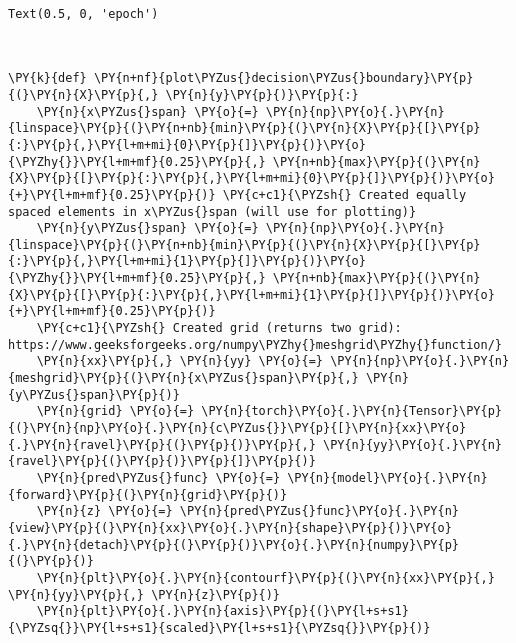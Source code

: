             \begin{tcolorbox}[breakable, size=fbox, boxrule=.5pt, pad at break*=1mm, opacityfill=0]
\begin{Verbatim}[commandchars=\\\{\}]
Text(0.5, 0, 'epoch')
\end{Verbatim}
\end{tcolorbox}
        
    \begin{center}
    \end{center}
    { \hspace*{\fill} \\}
    
    \begin{tcolorbox}[breakable, size=fbox, boxrule=1pt, pad at break*=1mm,colback=cellbackground, colframe=cellborder]
\begin{Verbatim}[commandchars=\\\{\}]
\PY{k}{def} \PY{n+nf}{plot\PYZus{}decision\PYZus{}boundary}\PY{p}{(}\PY{n}{X}\PY{p}{,} \PY{n}{y}\PY{p}{)}\PY{p}{:}
    \PY{n}{x\PYZus{}span} \PY{o}{=} \PY{n}{np}\PY{o}{.}\PY{n}{linspace}\PY{p}{(}\PY{n+nb}{min}\PY{p}{(}\PY{n}{X}\PY{p}{[}\PY{p}{:}\PY{p}{,}\PY{l+m+mi}{0}\PY{p}{]}\PY{p}{)}\PY{o}{\PYZhy{}}\PY{l+m+mf}{0.25}\PY{p}{,} \PY{n+nb}{max}\PY{p}{(}\PY{n}{X}\PY{p}{[}\PY{p}{:}\PY{p}{,}\PY{l+m+mi}{0}\PY{p}{]}\PY{p}{)}\PY{o}{+}\PY{l+m+mf}{0.25}\PY{p}{)} \PY{c+c1}{\PYZsh{} Created equally spaced elements in x\PYZus{}span (will use for plotting)}
    \PY{n}{y\PYZus{}span} \PY{o}{=} \PY{n}{np}\PY{o}{.}\PY{n}{linspace}\PY{p}{(}\PY{n+nb}{min}\PY{p}{(}\PY{n}{X}\PY{p}{[}\PY{p}{:}\PY{p}{,}\PY{l+m+mi}{1}\PY{p}{]}\PY{p}{)}\PY{o}{\PYZhy{}}\PY{l+m+mf}{0.25}\PY{p}{,} \PY{n+nb}{max}\PY{p}{(}\PY{n}{X}\PY{p}{[}\PY{p}{:}\PY{p}{,}\PY{l+m+mi}{1}\PY{p}{]}\PY{p}{)}\PY{o}{+}\PY{l+m+mf}{0.25}\PY{p}{)} 
    \PY{c+c1}{\PYZsh{} Created grid (returns two grid): https://www.geeksforgeeks.org/numpy\PYZhy{}meshgrid\PYZhy{}function/}
    \PY{n}{xx}\PY{p}{,} \PY{n}{yy} \PY{o}{=} \PY{n}{np}\PY{o}{.}\PY{n}{meshgrid}\PY{p}{(}\PY{n}{x\PYZus{}span}\PY{p}{,} \PY{n}{y\PYZus{}span}\PY{p}{)}
    \PY{n}{grid} \PY{o}{=} \PY{n}{torch}\PY{o}{.}\PY{n}{Tensor}\PY{p}{(}\PY{n}{np}\PY{o}{.}\PY{n}{c\PYZus{}}\PY{p}{[}\PY{n}{xx}\PY{o}{.}\PY{n}{ravel}\PY{p}{(}\PY{p}{)}\PY{p}{,} \PY{n}{yy}\PY{o}{.}\PY{n}{ravel}\PY{p}{(}\PY{p}{)}\PY{p}{]}\PY{p}{)}
    \PY{n}{pred\PYZus{}func} \PY{o}{=} \PY{n}{model}\PY{o}{.}\PY{n}{forward}\PY{p}{(}\PY{n}{grid}\PY{p}{)}
    \PY{n}{z} \PY{o}{=} \PY{n}{pred\PYZus{}func}\PY{o}{.}\PY{n}{view}\PY{p}{(}\PY{n}{xx}\PY{o}{.}\PY{n}{shape}\PY{p}{)}\PY{o}{.}\PY{n}{detach}\PY{p}{(}\PY{p}{)}\PY{o}{.}\PY{n}{numpy}\PY{p}{(}\PY{p}{)}
    \PY{n}{plt}\PY{o}{.}\PY{n}{contourf}\PY{p}{(}\PY{n}{xx}\PY{p}{,} \PY{n}{yy}\PY{p}{,} \PY{n}{z}\PY{p}{)}
    \PY{n}{plt}\PY{o}{.}\PY{n}{axis}\PY{p}{(}\PY{l+s+s1}{\PYZsq{}}\PY{l+s+s1}{scaled}\PY{l+s+s1}{\PYZsq{}}\PY{p}{)}
\end{Verbatim}
\end{tcolorbox}

